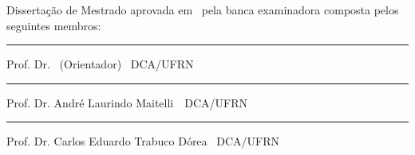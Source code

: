 \begin{titlepage}
\begin{center}

\LARGE

\textbf{\titulo}

\vfill

\Large

\textbf{\autor}

\end{center}

\vfill

\noindent
Dissertação de Mestrado aprovada em \dataaprovacao\ pela banca
examinadora composta pelos seguintes membros:

\begin{center}


\vspace{1.5cm}\rule{0.95\linewidth}{1pt}
\parbox{0.9\linewidth}{%
Prof. Dr. \orientador\ (Orientador) \dotfill\ DCA/UFRN}

\vspace{1.5cm}\rule{0.95\linewidth}{1pt}
\parbox{0.9\linewidth}{%
Prof. Dr. André Laurindo Maitelli\ \dotfill\ DCA/UFRN}

\vspace{1.5cm}\rule{0.95\linewidth}{1pt}
\parbox{0.9\linewidth}{%
Prof. Dr. Carlos Eduardo Trabuco Dórea \dotfill\ DCA/UFRN}

\end{center}
\end{titlepage}

